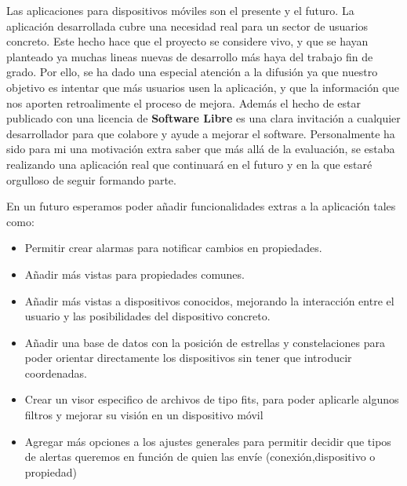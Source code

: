 \bigskip
Las aplicaciones para dispositivos móviles son el presente y el futuro. La aplicación desarrollada cubre una necesidad real para un sector de usuarios concreto. Este hecho hace que el proyecto se considere vivo, y que se hayan planteado ya muchas lineas nuevas de desarrollo más haya del trabajo fin de grado. Por ello, se ha dado una especial atención a la difusión ya que nuestro objetivo es intentar que más usuarios usen la aplicación, y que la información que nos aporten retroalimente el proceso de mejora. Además el hecho de estar publicado con una licencia de \textbf{Software Libre} es una clara invitación a cualquier desarrollador para que colabore y ayude a mejorar el software. Personalmente ha sido para mi una motivación extra saber que más allá de la evaluación, se estaba realizando una aplicación real que continuará en el futuro y en la que estaré orgulloso de seguir formando parte.

\bigskip
En un futuro esperamos poder añadir funcionalidades extras a la aplicación tales como:

\begin{itemize}
  \item Permitir crear alarmas para notificar cambios en propiedades.
  \item Añadir más vistas para propiedades comunes.
  \item Añadir más vistas a dispositivos conocidos, mejorando la interacción entre el usuario y las posibilidades del dispositivo concreto.
  \item Añadir una base de datos con la posición de estrellas y constelaciones para poder orientar directamente los dispositivos sin tener que introducir coordenadas.
  \item Crear un visor especifico de archivos de tipo fits, para poder aplicarle algunos filtros y mejorar su visión en un dispositivo móvil
  \item Agregar más opciones a los ajustes generales para permitir decidir que tipos de alertas queremos en función de quien las envíe (conexión,dispositivo o propiedad)
\end{itemize}


